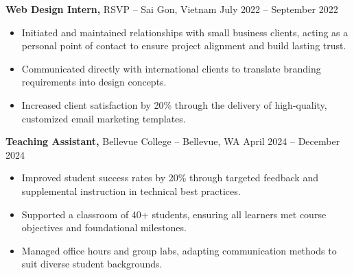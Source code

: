 \documentclass[11pt]{article}       %
\begin{document}
\textbf{Web Design Intern,} {RSVP} -- Sai Gon, Vietnam \hfill July 2022 -- September 2022 \\
\vspace{-9pt}
\begin{itemize}
  \item Initiated and maintained relationships with small business clients, acting as a personal point of contact to ensure project alignment and build lasting trust.
  \item Communicated directly with international clients to translate branding requirements into design concepts.
  \item Increased client satisfaction by 20\% through the delivery of high-quality, customized email marketing templates.
\end{itemize}

\textbf{Teaching Assistant,} {Bellevue College} -- Bellevue, WA \hfill April 2024 -- December 2024 \\
\vspace{-9pt}
\begin{itemize}
  \item Improved student success rates by 20\% through targeted feedback and supplemental instruction in technical best practices.
  \item Supported a classroom of 40+ students, ensuring all learners met course objectives and foundational milestones.
  \item Managed office hours and group labs, adapting communication methods to suit diverse student backgrounds.
\end{itemize}

\end{document}
